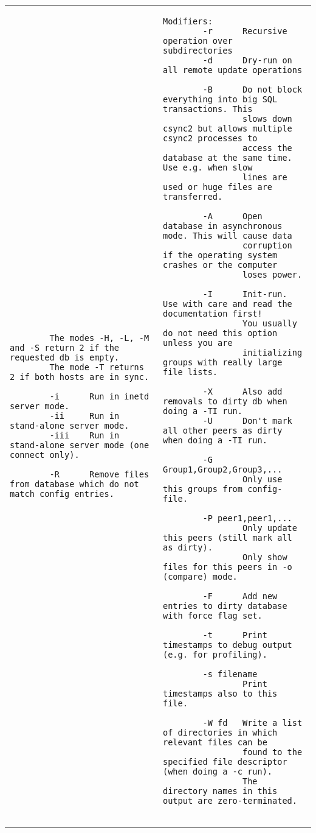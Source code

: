 \documentclass[a4paper,twocolumn]{article}
\begin{document}
\begin{figure*}[t]
\begin{center}
\begin{tabular}{|p{0.5\linewidth}|p{0.5\linewidth}|}
\begin{tiny}
\begin{verbatim}
        The modes -H, -L, -M and -S return 2 if the requested db is empty.
        The mode -T returns 2 if both hosts are in sync.

        -i      Run in inetd server mode.
        -ii     Run in stand-alone server mode.
        -iii    Run in stand-alone server mode (one connect only).

        -R      Remove files from database which do not match config entries.
\end{verbatim}
\end{tiny}

&

\begin{tiny}
\begin{verbatim}
Modifiers:
        -r      Recursive operation over subdirectories
        -d      Dry-run on all remote update operations

        -B      Do not block everything into big SQL transactions. This
                slows down csync2 but allows multiple csync2 processes to
                access the database at the same time. Use e.g. when slow
                lines are used or huge files are transferred.

        -A      Open database in asynchronous mode. This will cause data
                corruption if the operating system crashes or the computer
                loses power.

        -I      Init-run. Use with care and read the documentation first!
                You usually do not need this option unless you are
                initializing groups with really large file lists.

        -X      Also add removals to dirty db when doing a -TI run.
        -U      Don't mark all other peers as dirty when doing a -TI run.

        -G Group1,Group2,Group3,...
                Only use this groups from config-file.

        -P peer1,peer1,...
                Only update this peers (still mark all as dirty).
                Only show files for this peers in -o (compare) mode.

        -F      Add new entries to dirty database with force flag set.

        -t      Print timestamps to debug output (e.g. for profiling).

        -s filename
                Print timestamps also to this file.

        -W fd   Write a list of directories in which relevant files can be
                found to the specified file descriptor (when doing a -c run).
                The directory names in this output are zero-terminated.


\end{verbatim}
\end{tiny}
\end{tabular}
\end{center}
\end{figure*}
\end{document}
